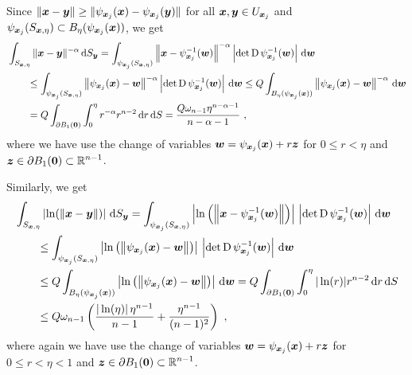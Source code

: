 Since $\displaystyle \|{\bm{x}}-{\bm{y}}\| 
\geq \|\psi_{{\bm{x}}_j}({\bm{x}}) - \psi_{{\bm{x}}_j}({\bm{y}})\|$ for all
$\displaystyle {\bm{x}},{\bm{y}} \in U_{{\bm{x}}_j}$ and
$\displaystyle \psi_{{\bm{x}}_j}(S_{{\bm{x}},\eta}) \subset
B_{\eta}(\psi_{{\bm{x}}_j}({\bm{x}}))$, we get
\begin{align*}
&\int_{S_{{\bm{x}},\eta}} \|{\bm{x}}-{\bm{y}}\|^{-\alpha} \,\mathrm{d}{S}_{{\bm{y}}}
= \int_{\psi_{{\bm{x}}_j}(S_{{\bm{x}},\eta})}
\left\|{\bm{x}}-\psi_{{\bm{x}}_j}^{-1}({\bm{w}})\right\|^{-\alpha}
\left| \det \operatorname{D} \psi_{{\bm{x}}_j}^{-1}({\bm{w}})\right| \,\mathrm{d}{{\bm{w}}} \\
& \qquad
\leq \int_{\psi_{{\bm{x}}_j}(S_{{\bm{x}},\eta})}
\left\|\psi_{{\bm{x}}_j}({\bm{x}})-{\bm{w}}\right\|^{-\alpha}
\left| \det \operatorname{D} \psi_{{\bm{x}}_j}^{-1}({\bm{w}})\right| \,\mathrm{d}{{\bm{w}}}
\leq Q \int_{B_{\eta}(\psi_{{\bm{x}}_j}({\bm{x}}))}
\left\|\psi_{{\bm{x}}_j}({\bm{x}})-{\bm{w}}\right\|^{-\alpha} \,\mathrm{d}{{\bm{w}}} \\
&\qquad
= Q \int_{\partial B_1({\bm{0}})} \int_0^\eta r^{-\alpha}
r^{n-2} \,\mathrm{d}{r} \,\mathrm{d}{S}
= \frac{ Q \omega_{n-1} \eta^{n-\alpha-1}}{n-\alpha -1} \ ,
\end{align*}
where we have use the change of variables
${\bm{w}} = \psi_{{\bm{x}}_j}({\bm{x}}) + r {\bm{z}}$ for
$0 \leq r < \eta$ and
$\displaystyle {\bm{z}} \in \partial B_1({\bm{0}}) \subset \mathbb{R}^{n-1}$.

Similarly, we get
\begin{align*}
&\int_{S_{{\bm{x}},\eta}} \left|\ln(\|{\bm{x}}-{\bm{y}}\|)\right| \,\mathrm{d}{S}_{{\bm{y}}}
= \int_{\psi_{{\bm{x}}_j}(S_{{\bm{x}},\eta})}
\left| \ln\left(\left\|{\bm{x}}
-\psi_{{\bm{x}}_j}^{-1}({\bm{w}})\right\|\right)\right| \,
\left| \det \operatorname{D} \psi_{{\bm{x}}_j}^{-1}({\bm{w}})\right| \,\mathrm{d}{{\bm{w}}} \\
&\qquad \leq \int_{\psi_{{\bm{x}}_j}(S_{{\bm{x}},\eta})}
\left| \ln\left( \left\|\psi_{{\bm{x}}_j}({\bm{x}})-{\bm{w}}\right\|\right)\right|
\, \left| \det \operatorname{D} \psi_{{\bm{x}}_j}^{-1}({\bm{w}})\right| \,\mathrm{d}{{\bm{w}}} \\
&\qquad \leq Q \int_{B_{\eta}(\psi_{{\bm{x}}_j}({\bm{x}}))}
\left|\ln\left( \left\|\psi_{{\bm{x}}_j}({\bm{x}})-{\bm{w}}\right\|\right)\right|
\,\mathrm{d}{{\bm{w}}}
= Q \int_{\partial B_1({\bm{0}})} \int_0^\eta |\ln(r)|
  r^{n-2} \,\mathrm{d}{r} \,\mathrm{d}{S} \\
&\qquad \leq Q \omega_{n-1} \left( \frac{|\ln(\eta)|\, \eta^{n-1}}{n-1}  +
  \frac{\eta^{n-1}}{(n-1)^2}  \right) \ ,
\end{align*}
where again we have use the change of variables 
${\bm{w}} = \psi_{{\bm{x}}_j}({\bm{x}}) + r {\bm{z}}$ for
$0 \leq r < \eta <1$ and
$\displaystyle {\bm{z}} \in \partial B_1({\bm{0}}) \subset \mathbb{R}^{n-1}$.


